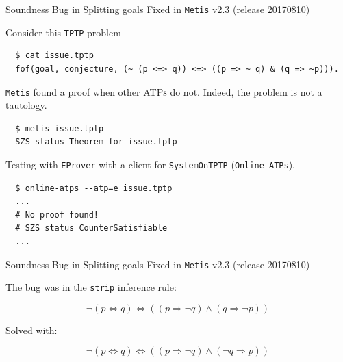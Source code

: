 \documentclass[10pt, xetex, hyperref={pdfpagelabels=false}]{beamer}
\newcommand{\abbre}[1]{\textsc{#1}\xspace}
\newcommand{\ATPs}{\abbre{ATPs}}
\newcommand{\name}[1]{\texttt{#1}\xspace}
\newcommand{\prg}[1]{\texttt{#1}\xspace}
\newcommand{\Metis}{\prg{Metis}}
\newcommand{\len}[1]{\texttt{#1}\xspace}
\newcommand{\TPTP}{\len{TPTP}}
\begin{document}
\begin{frame}[fragile]{Soundness Bug in Splitting goals}
  {Fixed in \Metis v2.3 (release 20170810)}

Consider this \TPTP problem
\begin{verbatim}
  $ cat issue.tptp
  fof(goal, conjecture, (~ (p <=> q)) <=> ((p => ~ q) & (q => ~p))).
\end{verbatim}

\Metis found a proof when other \ATPs do not. Indeed, the problem is not a tautology.

\begin{verbatim}
  $ metis issue.tptp
  SZS status Theorem for issue.tptp
\end{verbatim}

Testing with \name{EProver} with a client for \name{SystemOnTPTP} (\name{Online-ATPs}).

\begin{verbatim}
  $ online-atps --atp=e issue.tptp
  ...
  # No proof found!
  # SZS status CounterSatisfiable
  ...
\end{verbatim}

\end{frame}

\begin{frame}[fragile]{Soundness Bug in Splitting goals}
  {Fixed in \Metis v2.3 (release 20170810)}

The bug was in the \texttt{strip} inference rule:

\begin{equation*}
¬ (p ⇔ q) ⇔ ((p ⇒ ¬ q) ∧ (q ⇒ ¬ p))
\end{equation*}

Solved with:

\begin{equation*}
¬ (p ⇔ q) ⇔ ((p ⇒ ¬ q) ∧ (¬ q ⇒ p))
\end{equation*}

\end{frame}
\end{document}
